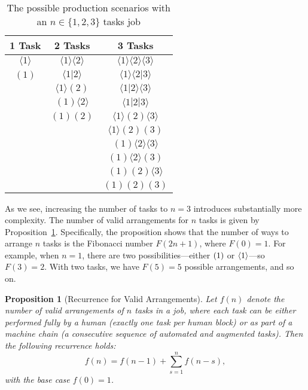 \documentclass{article}
\theoremstyle{plain}
\theoremstyle{plain}
\newtheorem{proposition}[theorem]{Proposition}
\begin{document}
\begin{table}
  \centering
  \caption{The possible production scenarios with an \(n \in \{1,2,3\}\) tasks job}
  \label{tab:tree}
  \begin{tabular}{ccc}
  \hline
  1 Task & 2 Tasks & 3 Tasks \\
  \hline
  $\langle 1 \rangle$ & $\langle 1 \rangle \langle 2 \rangle$ & $\langle 1 \rangle \langle 2 \rangle \langle 3 \rangle$ \\
  $(1)$ & $\langle 1|2 \rangle$ & $\langle 1 \rangle \langle 2|3 \rangle$ \\
  & $\langle 1 \rangle (2)$ & $\langle 1|2 \rangle \langle 3 \rangle$ \\
  & $(1) \langle 2 \rangle$ & $\langle 1|2|3 \rangle$ \\
  & $(1) (2)$ & $\langle 1 \rangle (2) \langle 3 \rangle$ \\
  & & $\langle 1 \rangle (2) (3)$ \\
  & & $(1) \langle 2 \rangle \langle 3 \rangle$ \\
  & & $(1) \langle 2 \rangle (3)$ \\
  & & $(1) (2) \langle 3 \rangle$ \\
  & & $(1) (2) (3)$ \\
  \hline
  \end{tabular}
\end{table}

As we see, increasing the number of tasks to \(n=3\) introduces substantially more complexity.
The number of valid arrangements for \(n\) tasks is given by Proposition~\ref{proposition:num_arrangements}.
Specifically, the proposition shows that the number of ways to arrange \(n\) tasks is the Fibonacci number \(F(2n+1)\), where \(F(0) = 1\).
For example, when \(n=1\), there are two possibilities---either \(( 1 )\) or \(\langle 1 \rangle\)---so \(F(3) = 2\).
With two tasks, we have \(F(5) = 5\) possible arrangements, and so on.

\begin{proposition}[Recurrence for Valid Arrangements] \label{proposition:num_arrangements}
  Let \(f(n)\) denote the number of valid arrangements of \(n\) tasks in a job, where each task can be either performed fully by a human (exactly one task per human block) or as part of a machine chain (a consecutive sequence of automated and augmented tasks). Then the following recurrence holds:
  \[
  f(n) = f(n-1) + \sum_{s=1}^{n} f(n-s),
  \]
  with the base case \(f(0) = 1\).
\end{proposition}
\end{document}
